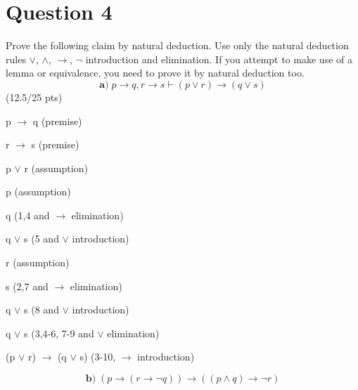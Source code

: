 \documentclass[a4paper,12pt]{article}
\newcommand\tab[1][1cm]{\hspace*{#1}}
\begin{document}
\section*{Question 4 \hfill {}}
\tab Prove the following claim by natural deduction. Use only the natural deduction rules $\vee$, $\wedge$, $\rightarrow$, $\neg$ introduction and elimination. If you attempt to make use of a lemma or equivalence, you need to prove it by natural deduction too.
\begin{equation*}
    \textbf{a)} \; p \rightarrow q, r \rightarrow s \vdash (p \vee r) \rightarrow (q \vee s)
\end{equation*}
\hfill \small{(12.5/25 pts)}\\
\begin{tcolorbox}
\begin{enumerate}
    \item p $\rightarrow$ q \tab (premise)
    \item r $\rightarrow$ s \tab (premise)
    \begin{tcolorbox}
        \item p $\vee$ r \tab (assumption)
        \begin{tcolorbox}
            \item p \tab (assumption)
            \item q \tab (1,4 and $\rightarrow$ elimination)
            \item q $\vee$ s \tab (5 and $\vee$ introduction)
        \end{tcolorbox}
        \begin{tcolorbox}
            \item r \tab (assumption)
            \item s \tab (2,7 and $\rightarrow$ elimination)
            \item q $\vee$ s \tab (8 and $\vee$ introduction)
        \end{tcolorbox}
        \item q $\vee$ s \tab (3,4-6, 7-9 and $\vee$ elimination)
    \end{tcolorbox}
    \item (p $\vee$ r) $\rightarrow$ (q $\vee$ s) \tab (3-10, $\rightarrow$ introduction)
\end{enumerate}
\end{tcolorbox}
\newpage
\begin{equation*}
     \textbf{b)} \;  (p \rightarrow (r \rightarrow \neg q)) \rightarrow ((p \wedge q) \rightarrow \neg r)
\end{equation*}
\end{document}
